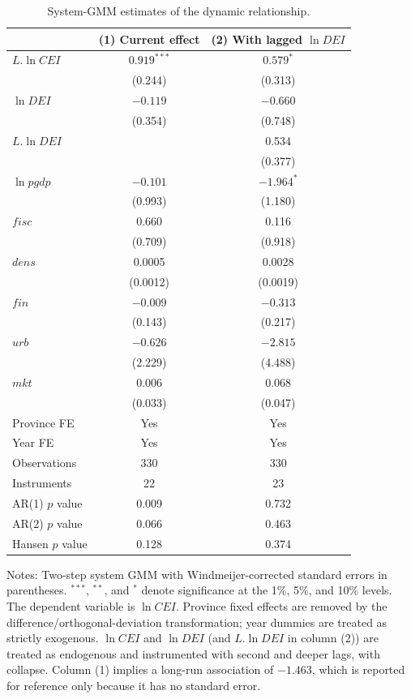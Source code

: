 \documentclass[economies,article,submit,moreauthors]{Definitions/mdpi}
\begin{document}
\begin{table}[H]
\centering
\caption{System-GMM estimates of the dynamic relationship.}
\label{tab:gmm}
\footnotesize
\setlength{\tabcolsep}{4pt}
\begin{threeparttable}
\begin{tabular*}{0.75\textwidth}{@{\extracolsep{\fill}}lcc}
\toprule
 & (1) Current effect & (2) With lagged $\ln DEI$\\
\midrule
$L.\ln CEI$ & $0.919^{***}$ & $0.579^{*}$\\
 & (0.244) & (0.313)\\
$\ln DEI$ & $-0.119$ & $-0.660$\\
 & (0.354) & (0.748)\\
$L.\ln DEI$ & & 0.534\\
 & & (0.377)\\
\midrule
$\ln pgdp$ & $-0.101$ & $-1.964^{*}$\\
 & (0.993) & (1.180)\\
$fisc$ & 0.660 & 0.116\\
 & (0.709) & (0.918)\\
$dens$ & 0.0005 & 0.0028\\
 & (0.0012) & (0.0019)\\
$fin$ & $-0.009$ & $-0.313$\\
 & (0.143) & (0.217)\\
$urb$ & $-0.626$ & $-2.815$\\
 & (2.229) & (4.488)\\
$mkt$ & 0.006 & 0.068\\
 & (0.033) & (0.047)\\
\midrule
Province FE & Yes & Yes\\
Year FE & Yes & Yes\\
Observations & 330 & 330\\
Instruments & 22 & 23\\
AR(1) $p$ value & 0.009 & 0.732\\
AR(2) $p$ value & 0.066 & 0.463\\
Hansen $p$ value & 0.128 & 0.374\\
\bottomrule
\end{tabular*}
\begin{tablenotes}\footnotesize
\item Notes: Two-step system GMM with Windmeijer-corrected standard errors in parentheses. $^{***}$, $^{**}$, and $^{*}$ denote significance at the 1\%, 5\%, and 10\% levels. The dependent variable is $\ln CEI$. Province fixed effects are removed by the difference/orthogonal-deviation transformation; year dummies are treated as strictly exogenous. $\ln CEI$ and $\ln DEI$ (and $L.\ln DEI$ in column (2)) are treated as endogenous and instrumented with second and deeper lags, with collapse. Column (1) implies a long-run association of $-1.463$, which is reported for reference only because it has no standard error.
\end{tablenotes}
\end{threeparttable}
\end{table}
\end{document}
